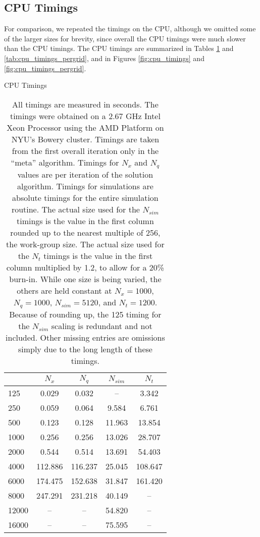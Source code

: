 \documentclass[a4paper,12pt]{article}
\numberwithin{equation}{section}
\theoremstyle{definition}
\begin{document}
\subsection{CPU Timings}

For comparison, we repeated the timings on the CPU, although we
omitted some of the larger sizes for brevity, since overall the CPU
timings were much slower than the CPU timings. The CPU timings are
summarized in Tables \ref{tab:cpu_timings} and
\ref{tab:cpu_timings_pergrid}, and in Figures \ref{fig:cpu_timings}
and \ref{fig:cpu_timings_pergrid}.

\begin{table}[ht]
  \centering
  \caption{CPU Timings}
  \label{tab:cpu_timings}
  \begin{tabular}{l c c c c}
    \toprule
    & $N_x$ & $N_q$ & $N_{sim}$ & $N_t$ \\
    \midrule
    125 & 0.029 & 0.032 &  -- & 3.342 \\
    250 & 0.059 & 0.064 & 9.584 & 6.761 \\
    500 & 0.123 & 0.128 & 11.963 & 13.854 \\
    1000 & 0.256 & 0.256 & 13.026 & 28.707 \\
    2000 & 0.544 & 0.514 & 13.691 & 54.403 \\
    4000 & 112.886 & 116.237 & 25.045 & 108.647 \\
    6000 & 174.475 & 152.638 & 31.847 & 161.420 \\
    8000 & 247.291 & 231.218 & 40.149 &  -- \\
    12000 &  -- &  -- & 54.820 &  -- \\
    16000 &  -- &  -- & 75.595 &  -- \\
    \bottomrule
  \end{tabular}
  \caption*{\footnotesize All timings are measured in seconds. The timings were obtained on a 2.67 GHz Intel Xeon Processor using the AMD Platform on NYU's Bowery cluster. Timings are taken from the first overall iteration only in the ``meta'' algorithm. Timings for $N_x$ and $N_q$ values are per iteration of the solution algorithm. Timings for simulations are absolute timings for the entire simulation routine. The actual size used for the $N_{sim}$ timings is the value in the first column rounded up to the nearest multiple of 256, the work-group size. The actual size used for the $N_t$ timings is the value in the first column multiplied by 1.2, to allow for a 20\% burn-in. While one size is being varied, the others are held constant at $N_x = 1000$, $N_q = 1000$, $N_{sim} = 5120$, and $N_t = 1200$. Because of rounding up, the 125 timing for the $N_{sim}$ scaling is redundant and not included. Other missing entries are omissions simply due to the long length of these timings.}
\end{table}
\end{document}
